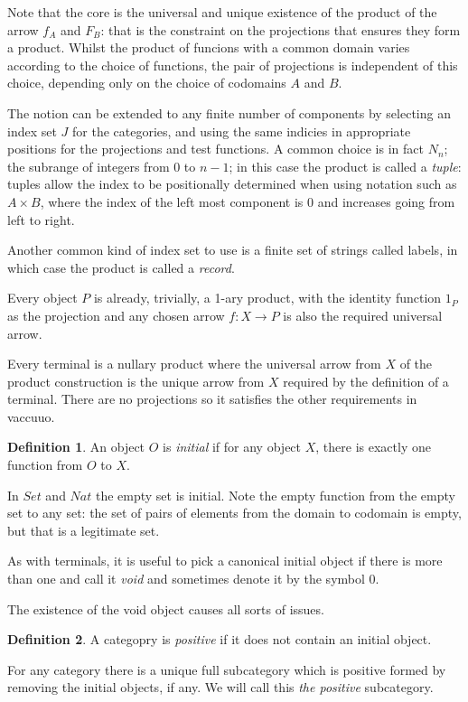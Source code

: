 \documentclass[oneside]{book}
\theoremstyle{plain}
\theoremstyle{definition}
\newtheorem{definition}{Definition}
\theoremstyle{plain}
\def\Set{\mathit{Set}}
\def\Nat{\mathit{Nat}}
\begin{document}
Note that the core is the universal and unique existence of the product of the arrow $f_A$ and
$F_B$: that is the constraint on the projections that ensures they form a product.
Whilst the product of funcions with a common domain varies according to the choice 
of functions, the pair of projections is independent of this choice, depending only
on the choice of codomains $A$ and $B$. 

The notion can be extended to any finite number of components
by selecting an index set $J$ for the categories, and using the 
same indicies in appropriate positions for the projections and
test functions. A common choice is in fact $N_n$; the subrange of integers
from 0 to $n-1$; in this case
the product is called a {\em tuple}: tuples allow the index
to be positionally determined when using notation such as $A\times B$,
where the index of the left most component is 0 and increases going
from left to right.

Another common kind of index set to use is a finite set of strings called
labels, in which case the product is called a {\em record}.

Every object $P$ is already, trivially, a 1-ary product, with the identity function $1_P$ as
the projection and any chosen arrow $f:X\rightarrow P$ is also the required
universal arrow.

Every terminal is a nullary product where the universal arrow from $X$
of the product construction is the unique arrow from $X$ required
by the definition of a terminal. There are no projections
so it satisfies the other requirements in vaccuuo.

\begin{definition}
An object $O$ is {\em initial} if
for any object $X$, there is exactly
one function from $O$ to $X$.
\end{definition}

In $\Set$ and $\Nat$ the empty set is initial.
Note the empty function from the empty set to any
set: the set of pairs of elements from the domain to
codomain is empty, but that is a legitimate set.

As with terminals, it is useful to pick a canonical initial
object if there is more than one and
call it {\em void} and sometimes denote it by the symbol 0.

The existence of the void object causes all sorts of issues.
\begin{definition}
A categopry is {\em positive} if it does not contain an initial object.
\end{definition}
For any category there is a unique full subcategory which is positive formed
by removing the initial objects, if any. We will call this {\em the positive}
subcategory.
\end{document}
